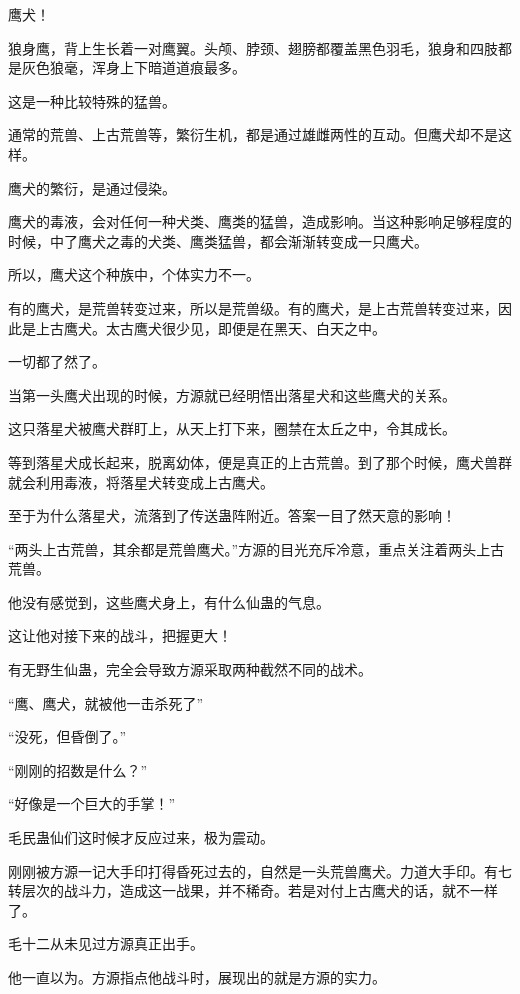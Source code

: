 
\begin{this_body}

鹰犬！

狼身鹰，背上生长着一对鹰翼。头颅、脖颈、翅膀都覆盖黑色羽毛，狼身和四肢都是灰色狼毫，浑身上下暗道道痕最多。

这是一种比较特殊的猛兽。

通常的荒兽、上古荒兽等，繁衍生机，都是通过雄雌两性的互动。但鹰犬却不是这样。

鹰犬的繁衍，是通过侵染。

鹰犬的毒液，会对任何一种犬类、鹰类的猛兽，造成影响。当这种影响足够程度的时候，中了鹰犬之毒的犬类、鹰类猛兽，都会渐渐转变成一只鹰犬。

所以，鹰犬这个种族中，个体实力不一。

有的鹰犬，是荒兽转变过来，所以是荒兽级。有的鹰犬，是上古荒兽转变过来，因此是上古鹰犬。太古鹰犬很少见，即便是在黑天、白天之中。

一切都了然了。

当第一头鹰犬出现的时候，方源就已经明悟出落星犬和这些鹰犬的关系。

这只落星犬被鹰犬群盯上，从天上打下来，圈禁在太丘之中，令其成长。

等到落星犬成长起来，脱离幼体，便是真正的上古荒兽。到了那个时候，鹰犬兽群就会利用毒液，将落星犬转变成上古鹰犬。

至于为什么落星犬，流落到了传送蛊阵附近。答案一目了然天意的影响！

“两头上古荒兽，其余都是荒兽鹰犬。”方源的目光充斥冷意，重点关注着两头上古荒兽。

他没有感觉到，这些鹰犬身上，有什么仙蛊的气息。

这让他对接下来的战斗，把握更大！

有无野生仙蛊，完全会导致方源采取两种截然不同的战术。

“鹰、鹰犬，就被他一击杀死了”

“没死，但昏倒了。”

“刚刚的招数是什么？”

“好像是一个巨大的手掌！”

毛民蛊仙们这时候才反应过来，极为震动。

刚刚被方源一记大手印打得昏死过去的，自然是一头荒兽鹰犬。力道大手印。有七转层次的战斗力，造成这一战果，并不稀奇。若是对付上古鹰犬的话，就不一样了。

毛十二从未见过方源真正出手。

他一直以为。方源指点他战斗时，展现出的就是方源的实力。


\end{this_body}
